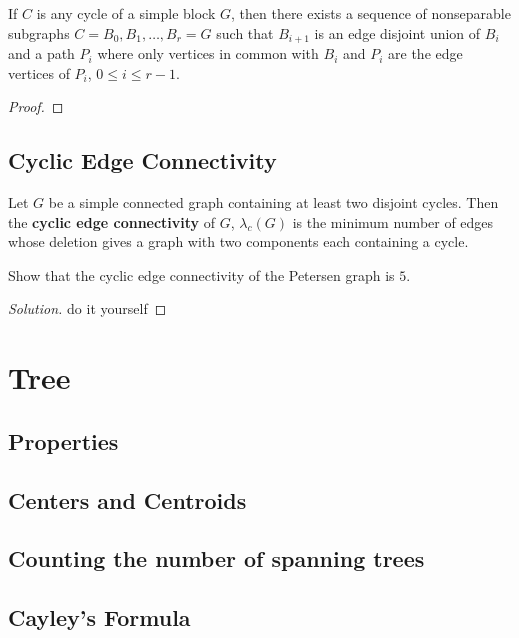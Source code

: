 \begin{theorem}
	If $C$ is any cycle of a simple block $G$, then there exists a sequence of nonseparable subgraphs $C = B_0,B_1,\dots,B_r = G$ such that $B_{i+1}$ is an edge disjoint union of $B_i$ and a path $P_i$ where only vertices in common with $B_i$ and $P_i$ are the edge vertices of $P_i$, $0 \le i \le r-1$.
\end{theorem}
\begin{proof}
\end{proof}

\subsection{Cyclic Edge Connectivity}
\begin{definition}
	Let $G$ be a simple connected graph containing at least two disjoint cycles. Then the \textbf{cyclic edge connectivity} of $G$, $\lambda_c(G)$ is the minimum number of edges whose deletion gives a graph with two components each containing a cycle.
\end{definition}

\begin{exercise}
	Show that the cyclic edge connectivity of the Petersen graph is $5$.
\end{exercise}
\begin{proof}[Solution]
	do it yourself
\end{proof}

\section{Tree}
\setcounter{subsection}{1}
\subsection{Properties}
\subsection{Centers and Centroids}
\subsection{Counting the number of spanning trees}
\subsection{Cayley's Formula}
\setcounter{subsection}{6}
